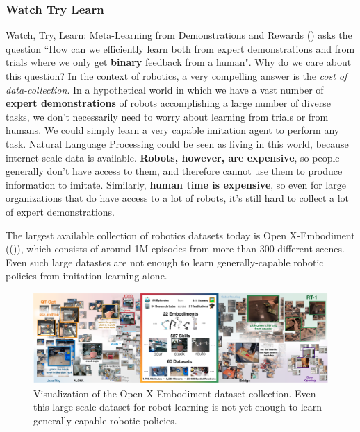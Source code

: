\documentclass[
  letterpaper,
  DIV=11,
  numbers=noendperiod,
  oneside]{scrreprt}
\theoremstyle{remark}
\begin{document}
\subsubsection*{Watch Try Learn}\label{sec:watch}

Watch, Try, Learn: Meta-Learning from Demonstrations and Rewards
() asks the question ``How
can we efficiently learn both from expert demonstrations and from trials
where we only get \textbf{binary} feedback from a human". Why do we care
about this question? In the context of robotics, a very compelling
answer is the \emph{cost of data-collection}. In a hypothetical world in
which we have a vast number of \textbf{expert demonstrations} of robots
accomplishing a large number of diverse tasks, we don't necessarily need
to worry about learning from trials or from humans. We could simply
learn a very capable imitation agent to perform any task. Natural
Language Processing could be seen as living in this world, because
internet-scale data is available. \textbf{Robots, however, are
expensive}, so people generally don't have access to them, and therefore
cannot use them to produce information to imitate. Similarly,
\textbf{human time is expensive}, so even for large organizations that
do have access to a lot of robots, it's still hard to collect a lot of
expert demonstrations.

The largest available collection of robotics datasets today is Open
X-Embodiment (()),
which consists of around 1M episodes from more than 300 different
scenes. Even such large datastes are not enough to learn
generally-capable robotic policies from imitation learning alone.

\begin{figure}

{\centering \includegraphics{src/Figures/open_x_embodiment.png}

}

\caption{Visualization of the Open X-Embodiment dataset collection. Even
this large-scale dataset for robot learning is not yet enough to learn
generally-capable robotic policies.}

\end{figure}%
\end{document}
